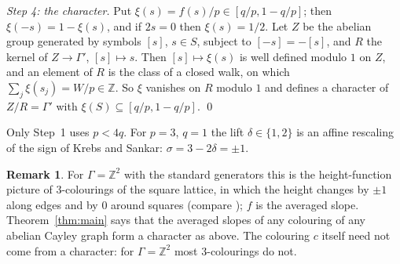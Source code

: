 \documentclass[11pt,a4paper]{amsart}
\theoremstyle{definition}
\newtheorem{remark}[theorem]{Remark}
\newcommand{\Z}{\mathbb{Z}}
\begin{document}
\smallskip
\emph{Step 4: the character.} Put $\xi(s)=f(s)/p\in[q/p,1-q/p]$; then $\xi(-s)=1-\xi(s)$, and if $2s=0$ then
$\xi(s)=1/2$. Let $Z$ be the abelian group generated by symbols $[s]$, $s\in S$, subject to $[-s]=-[s]$, and $R$ the
kernel of $Z\to\Gamma'$, $[s]\mapsto s$. Then $[s]\mapsto\xi(s)$ is well defined modulo $1$ on $Z$, and an element of
$R$ is the class of a closed walk, on which $\sum_j\xi(s_j)=W/p\in\Z$. So $\xi$ vanishes on $R$ modulo $1$ and
defines a character of $Z/R=\Gamma'$ with $\xi(S)\subseteq[q/p,1-q/p]$. \qed

\smallskip
Only Step~1 uses $p<4q$. For $p=3$, $q=1$ the lift $\delta\in\{1,2\}$ is an affine rescaling of the sign of Krebs
and Sankar: $\sigma=3-2\delta=\pm1$.

\begin{remark}
For $\Gamma=\Z^2$ with the standard generators this is the height-function picture of $3$-colourings of the
square lattice, in which the height changes by $\pm1$ along edges and by $0$ around squares (compare
\cite{Sheffield}); $f$ is the averaged slope. Theorem~\ref{thm:main} says that the averaged slopes of any colouring
of any abelian Cayley graph form a character as above. The colouring $c$ itself need not come from a character: for
$\Gamma=\Z^2$ most $3$-colourings do not.
\end{remark}
\end{document}
